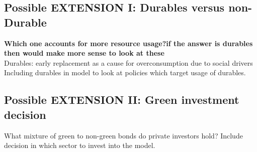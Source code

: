 \subsection{Possible EXTENSION I: Durables versus non-Durable}
\textbf{Which one accounts for more resource usage?\ar if the answer is durables then would make more sense to look at these}
\\
Durables: early replacement as a cause for overconsumption due to social drivers \citep{Hou2020FeelingsIntentions}
\\ 
Including durables in model to look at policies which target usage of durables.
\subsection{Possible EXTENSION II: Green investment decision}
What mixture of green to non-green bonds do private investors hold? Include decision in which sector to invest into the model.